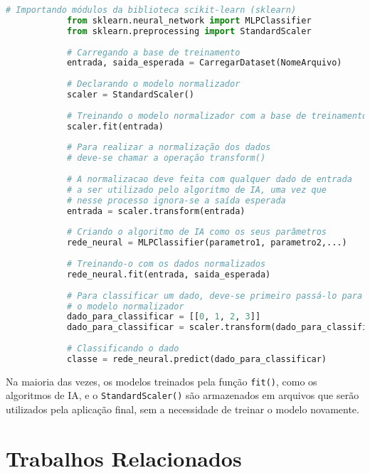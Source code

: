 \documentclass[12pt,oneside,a4paper,chapter=TITLE,section=TITLE,sumario
		=tradicional]{abntex2}
\begin{document}
		\begin{algoritmo}[H]
			\begin{lstlisting}[language=Python, literate={{â}{{\^a}}1{á}{{\'a}}1{à}{{\`a}}1{ã}{{\~a}}1{é}{{\'e}}1{ê}{{\^e}}1{í}{{\'i}}1{ó}{{\'o}}1{õ}{{\~o}}1{ú}{{\'u}}1{ü}{{\"u}}1{ç}{{\c{c}}}1}]		
			# Importando módulos da biblioteca scikit-learn (sklearn)
			from sklearn.neural_network import MLPClassifier		
			from sklearn.preprocessing import StandardScaler
			
			# Carregando a base de treinamento
			entrada, saida_esperada = CarregarDataset(NomeArquivo)
			
			# Declarando o modelo normalizador
			scaler = StandardScaler()
			
			# Treinando o modelo normalizador com a base de treinamento
			scaler.fit(entrada)
			
			# Para realizar a normalização dos dados 
			# deve-se chamar a operação transform()
			
			# A normalizacao deve feita com qualquer dado de entrada
			# a ser utilizado pelo algoritmo de IA, uma vez que
			# nesse processo ignora-se a saída esperada
			entrada = scaler.transform(entrada)
			
			# Criando o algoritmo de IA como os seus parâmetros
			rede_neural = MLPClassifier(parametro1, parametro2,...)
			
			# Treinando-o com os dados normalizados
			rede_neural.fit(entrada, saida_esperada)
			
			# Para classificar um dado, deve-se primeiro passá-lo para
			# o modelo normalizador
			dado_para_classificar = [[0, 1, 2, 3]]
			dado_para_classificar = scaler.transform(dado_para_classificar)
			
			# Classificando o dado
			classe = rede_neural.predict(dado_para_classificar)\end{lstlisting}
		\end{algoritmo}
		
		Na maioria das vezes, os modelos treinados pela função \texttt{fit()}, como os algoritmos de IA, e o \texttt{StandardScaler()} são armazenados em arquivos que serão utilizados pela aplicação final, sem a necessidade de treinar o modelo novamente. 
		
		\section{Trabalhos Relacionados}
		\label{cap:trabalhos}
		
\end{document}
